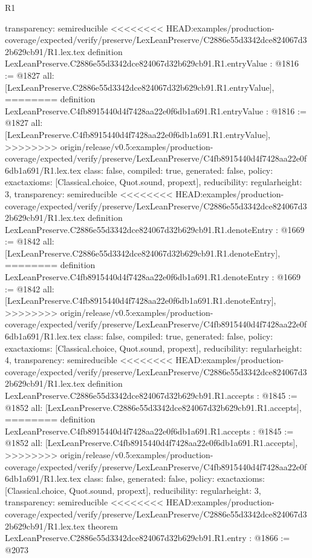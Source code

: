 \begin{lexlean}{R1}
\begin{coremodule}
{{{{{{{{{{{{{{{  transparency: semireducible
}
<<<<<<<< HEAD:examples/production-coverage/expected/verify/preserve/LexLeanPreserve/C2886e55d3342dce824067d32b629cb91/R1.lex.tex
definition LexLeanPreserve.C2886e55d3342dce824067d32b629cb91.R1.entryValue : @1816 := @1827 {
  all: [LexLeanPreserve.C2886e55d3342dce824067d32b629cb91.R1.entryValue],
========
definition LexLeanPreserve.C4fb8915440d4f7428aa22e0f6db1a691.R1.entryValue : @1816 := @1827 {
  all: [LexLeanPreserve.C4fb8915440d4f7428aa22e0f6db1a691.R1.entryValue],
>>>>>>>> origin/release/v0.5:examples/production-coverage/expected/verify/preserve/LexLeanPreserve/C4fb8915440d4f7428aa22e0f6db1a691/R1.lex.tex
  class: false,
  compiled: true,
  generated: false,
  policy: exact{axioms: [Classical.choice, Quot.sound, propext]},
  reducibility: regular{height: 3},
  transparency: semireducible
}
<<<<<<<< HEAD:examples/production-coverage/expected/verify/preserve/LexLeanPreserve/C2886e55d3342dce824067d32b629cb91/R1.lex.tex
definition LexLeanPreserve.C2886e55d3342dce824067d32b629cb91.R1.denoteEntry : @1669 := @1842 {
  all: [LexLeanPreserve.C2886e55d3342dce824067d32b629cb91.R1.denoteEntry],
========
definition LexLeanPreserve.C4fb8915440d4f7428aa22e0f6db1a691.R1.denoteEntry : @1669 := @1842 {
  all: [LexLeanPreserve.C4fb8915440d4f7428aa22e0f6db1a691.R1.denoteEntry],
>>>>>>>> origin/release/v0.5:examples/production-coverage/expected/verify/preserve/LexLeanPreserve/C4fb8915440d4f7428aa22e0f6db1a691/R1.lex.tex
  class: false,
  compiled: true,
  generated: false,
  policy: exact{axioms: [Classical.choice, Quot.sound, propext]},
  reducibility: regular{height: 4},
  transparency: semireducible
}
<<<<<<<< HEAD:examples/production-coverage/expected/verify/preserve/LexLeanPreserve/C2886e55d3342dce824067d32b629cb91/R1.lex.tex
definition LexLeanPreserve.C2886e55d3342dce824067d32b629cb91.R1.accepts : @1845 := @1852 {
  all: [LexLeanPreserve.C2886e55d3342dce824067d32b629cb91.R1.accepts],
========
definition LexLeanPreserve.C4fb8915440d4f7428aa22e0f6db1a691.R1.accepts : @1845 := @1852 {
  all: [LexLeanPreserve.C4fb8915440d4f7428aa22e0f6db1a691.R1.accepts],
>>>>>>>> origin/release/v0.5:examples/production-coverage/expected/verify/preserve/LexLeanPreserve/C4fb8915440d4f7428aa22e0f6db1a691/R1.lex.tex
  class: false,
  generated: false,
  policy: exact{axioms: [Classical.choice, Quot.sound, propext]},
  reducibility: regular{height: 3},
  transparency: semireducible
}
<<<<<<<< HEAD:examples/production-coverage/expected/verify/preserve/LexLeanPreserve/C2886e55d3342dce824067d32b629cb91/R1.lex.tex
theorem LexLeanPreserve.C2886e55d3342dce824067d32b629cb91.R1.entry : @1866 := @2073 {
}}}}}}}}}}}}}}}}}}
\end{coremodule}
\end{lexlean}
